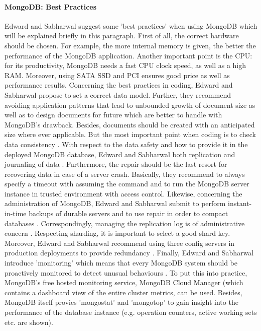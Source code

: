 \paragraph{MongoDB: Best Practices}

Edward and Sabharwal suggest some 'best practices' when using MongoDB \cite[p.234 ff.]{mongodb_edward} which will be explained briefly in this paragraph. 
First of all, the correct hardware should be chosen. For example, the more internal memory is given, the better the performance of the MongoDB application. Another important point is the CPU: for its productivity, MongoDB needs a fast \ac{CPU} clock speed, as well as a high \ac{RAM}. Moreover, using SATA SSD and \ac{PCI} ensures good price as well as performance results.
Concerning the best practices in coding, Edward and Sabharwal propose to set a correct data model. Further, they recommend avoiding application patterns that lead to unbounded growth of document size as well as to design documents for future which are better to handle with MongoDB's drawback. Besides, documents should be created with an anticipated size where ever applicable. But the most important point when coding is to check data consistency \cite[p.234 ff.]{mongodb_edward}. 
With respect to the data safety and how to provide it in the deployed MongoDB database, Edward and Sabharwal both replication and journaling of data \cite[p.234 ff.]{mongodb_edward}. Furthermore, the repair should be the last resort for recovering data in case of a server crash. Basically, they recommend to always specify a timeout with assuming the command and to run the MongoDB server instance in trusted environment with access control.
Likewise, concerning the administration of MongoDB, Edward and Sabharwal submit to perform instant-in-time backups of durable servers and to use repair in order to compact databases \cite[p.234 ff.]{mongodb_edward}. Correspondingly, managing the replication log is of administrative concern \cite[p.240 ff.]{mongodb_edward}. 
Respecting sharding, it is important to select a good shard key. Moreover, Edward and Sabharwal recommend using three config servers in production deployments to provide redundancy \cite[p.240 ff.]{mongodb_edward}. 
Finally, Edward and Sabharwal introduce 'monitoring' which means that every MongoDB system should be proactively monitored to detect unusual behaviours \cite[p.240 ff.]{mongodb_edward}. To put this into practice, MongoDB's free hosted monitoring service, MongoDB Cloud Manager (which contains a dashboard view of the entire cluster metrics, can be used. Besides, MongoDB itself provies 'mongostat' and 'mongotop' to gain insight into the performance of the database instance (e.g. operation counters, active working sets etc. are shown). 

